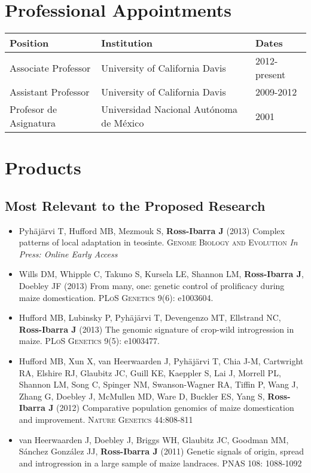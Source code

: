 \documentclass[11pt]{article}
\begin{document}
\section{Professional Appointments}

\begin{tabular}{l l l}
Position & Institution                 & Dates\\
\hline
Associate Professor & University of California Davis &		2012-present \\
Assistant Professor & University of California Davis &		2009-2012 \\
Profesor de Asignatura & Universidad Nacional Aut\'{o}noma de M\'{e}xico & 2001 \\
\hline
\end{tabular}

\section{Products}

\subsection*{Most Relevant to the Proposed Research}

\begin{itemize} \setlength{\itemsep}{0pt} \setlength{\parskip}{2pt} \setlength{\parsep}{0pt}

\item Pyh\"aj\"arvi T, Hufford MB, Mezmouk S, {\bf Ross-Ibarra J} (2013) Complex patterns of local adaptation in teosinte. \textsc{Genome Biology and Evolution} \emph{In Press: Online Early Access}

\item Wills DM, Whipple C, Takuno S, Kursela LE, Shannon LM, {\bf Ross-Ibarra J}, Doebley JF (2013) From many, one: genetic control of prolificacy during maize domestication. \textsc{PLoS Genetics} 9(6): e1003604. %

\item Hufford MB, Lubinsky P, Pyh\"aj\"arvi T, Devengenzo MT, Ellstrand NC, {\bf Ross-Ibarra J} (2013) The genomic signature of crop-wild introgression in maize. \textsc{PLoS Genetics} 9(5): e1003477. %

\item Hufford MB, Xun X, van Heerwaarden J, Pyh\"aj\"arvi T, Chia J-M, Cartwright RA, Elshire RJ, Glaubitz JC, Guill KE, Kaeppler S, Lai J, Morrell PL, Shannon LM, Song C, Spinger NM, Swanson-Wagner RA, Tiffin P, Wang J, Zhang G, Doebley J, McMullen MD, Ware D, Buckler ES, Yang S, {\bf Ross-Ibarra J} (2012) Comparative population genomics of maize domestication and improvement. \textsc{Nature Genetics} 44:808-811

\item van Heerwaarden J, Doebley J, Briggs WH, Glaubitz JC, Goodman MM, S\'{a}nchez Gonz\'{a}lez JJ, {\bf Ross-Ibarra J} (2011) Genetic signals of origin, spread and introgression in a large sample of maize landraces. PNAS 108: 1088-1092

\end{itemize}
\end{document}
